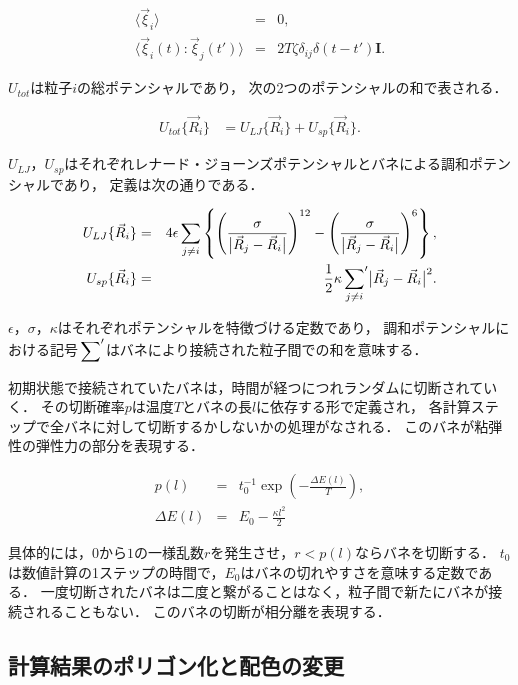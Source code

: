 \begin{eqnarray}
\label{eq:langevin0}
\langle\vec{\xi}_i\rangle &=& 0, \\
\label{eq:langevin1}
\langle\vec{\xi}_i(t):\vec{\xi}_j(t')\rangle &=& 2T\zeta\delta_{ij}\delta(t-t')\bm{I}.
\end{eqnarray}

$U_{tot}$は粒子$i$の総ポテンシャルであり，
次の2つのポテンシャルの和で表される．

\begin{eqnarray}
U_{tot}\{\vec{R}_i\}
&=
 U_{LJ}\{\vec{R}_i\}
+U_{sp}\{\vec{R}_i\}.
\end{eqnarray}

$U_{LJ}$，$U_{sp}$はそれぞれレナード・ジョーンズポテンシャルとバネによる調和ポテンシャルであり，
定義は次の通りである．

\begin{eqnarray}
U_{LJ}\{\vec{R}_i\}
&=&
4\epsilon\sum_{j\neq i}
\left\{
\left(
\frac{\sigma}{\bigl|\vec{R}_j-\vec{R}_i\bigr|}
\right)^{12}
-
\left(
\frac{\sigma}{\bigl|\vec{R}_j-\vec{R}_i\bigr|}
\right)^{6}
\right\},
\\
U_{sp}\{\vec{R}_i\}
&=&
\frac{1}{2}
\kappa
\sideset{}{'}\sum_{j\neq i}
\bigl|\vec{R}_j-\vec{R}_i\bigr|^{2}.
\end{eqnarray}

$\epsilon$，$\sigma$，$\kappa$はそれぞれポテンシャルを特徴づける定数であり，
調和ポテンシャルにおける記号$\sideset{}{'}\sum$はバネにより接続された粒子間での和を意味する．

初期状態で接続されていたバネは，時間が経つにつれランダムに切断されていく．
その切断確率$p$は温度$T$とバネの長$l$に依存する形で定義され，
各計算ステップで全バネに対して切断するかしないかの処理がなされる．
このバネが粘弾性の弾性力の部分を表現する．

\begin{eqnarray}
p(l)
&=&
t_0^{-1}
\exp\left(-\frac{\Delta E(l)}{T}\right)
,\\
\Delta E(l)
&=&
E_0-\frac{\kappa l^2}{2}
\end{eqnarray}

具体的には，$0$から$1$の一様乱数$r$を発生させ，$r<p(l)$ならバネを切断する．
$t_0$は数値計算の1ステップの時間で，$E_0$はバネの切れやすさを意味する定数である．
一度切断されたバネは二度と繋がることはなく，粒子間で新たにバネが接続されることもない．
このバネの切断が相分離を表現する．


\subsection{計算結果のポリゴン化と配色の変更}

